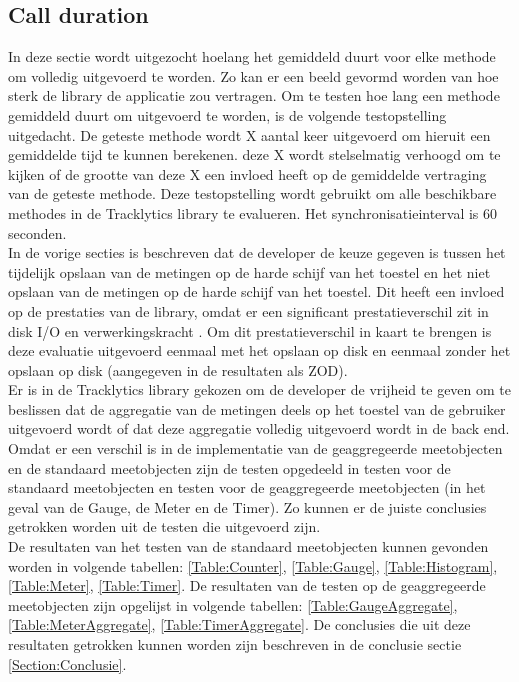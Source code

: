 \subsection{Call duration}
In deze sectie wordt uitgezocht hoelang het gemiddeld duurt voor elke methode om volledig uitgevoerd te worden. Zo kan er een beeld gevormd worden van hoe sterk de library de applicatie zou vertragen. Om te testen hoe lang een methode gemiddeld duurt om uitgevoerd te worden, is de volgende testopstelling uitgedacht. De geteste methode wordt X aantal keer uitgevoerd om hieruit een gemiddelde tijd te kunnen berekenen. deze X wordt stelselmatig verhoogd om te kijken of de grootte van deze X een invloed heeft op de gemiddelde vertraging van de geteste methode. Deze testopstelling wordt gebruikt om alle beschikbare methodes in de Tracklytics library te evalueren. Het synchronisatieinterval is 60 seconden. \\

In de vorige secties is beschreven dat de developer de keuze gegeven is tussen het tijdelijk opslaan van de metingen op de harde schijf van het toestel en het niet opslaan van de metingen op de harde schijf van het toestel. Dit heeft een invloed op de prestaties van de library, omdat er een significant prestatieverschil zit in disk I/O en verwerkingskracht \cite{diskIO}. Om dit prestatieverschil in kaart te brengen is deze evaluatie uitgevoerd eenmaal met het opslaan op disk en eenmaal zonder het opslaan op disk (aangegeven in de resultaten als ZOD).\\

Er is in de Tracklytics library gekozen om de developer de vrijheid te geven om te beslissen dat de aggregatie van de metingen deels op het toestel van de gebruiker uitgevoerd wordt of dat deze aggregatie volledig uitgevoerd wordt in de back end. Omdat er een verschil is in de implementatie van de geaggregeerde meetobjecten en de standaard meetobjecten zijn de testen opgedeeld in testen voor de standaard meetobjecten en testen voor de geaggregeerde meetobjecten (in het geval van de Gauge, de Meter en de Timer). Zo kunnen er de juiste conclusies getrokken worden uit de testen die uitgevoerd zijn.\\


De resultaten van het testen van de standaard meetobjecten kunnen gevonden worden in volgende tabellen: \ref{Table:Counter}, \ref{Table:Gauge}, \ref{Table:Histogram}, \ref{Table:Meter}, \ref{Table:Timer}. De resultaten van de testen op de geaggregeerde meetobjecten zijn opgelijst in volgende tabellen: \ref{Table:GaugeAggregate}, \ref{Table:MeterAggregate}, \ref{Table:TimerAggregate}. De conclusies die uit deze resultaten getrokken kunnen worden zijn beschreven in de conclusie sectie \ref{Section:Conclusie}. \\


